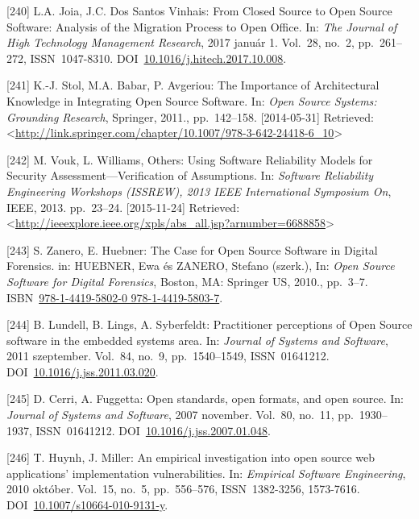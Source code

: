 \documentclass[12pt,magyar,a4paper,oneside]{scrreprt}
\begin{document}
\leavevmode\hypertarget{ref-joia_closed_2017}{}%
{[}240{]} L.A. Joia, J.C. Dos Santos Vinhais: From Closed Source to Open
Source Software: Analysis of the Migration Process to Open Office. In:
\emph{The Journal of High Technology Management Research}, 2017 január
1. Vol.~28, no.~2, pp.~261--272, ISSN~1047-8310.
DOI~\href{https://doi.org/10.1016/j.hitech.2017.10.008}{10.1016/j.hitech.2017.10.008}.

\leavevmode\hypertarget{ref-stol_importance_2011}{}%
{[}241{]} K.-J. Stol, M.A. Babar, P. Avgeriou: The Importance of
Architectural Knowledge in Integrating Open Source Software. In:
\emph{Open Source Systems: Grounding Research}, Springer, 2011.,
pp.~142--158. {[}2014-05-31{]} Retrieved:
\textless{}\url{http://link.springer.com/chapter/10.1007/978-3-642-24418-6_10}\textgreater{}

\leavevmode\hypertarget{ref-vouk_using_2013}{}%
{[}242{]} M. Vouk, L. Williams, Others: Using Software Reliability
Models for Security Assessment---Verification of Assumptions. In:
\emph{Software Reliability Engineering Workshops (ISSREW), 2013 IEEE
International Symposium On}, IEEE, 2013. pp.~23--24. {[}2015-11-24{]}
Retrieved:
\textless{}\url{http://ieeexplore.ieee.org/xpls/abs_all.jsp?arnumber=6688858}\textgreater{}

\leavevmode\hypertarget{ref-huebner_case_2010}{}%
{[}243{]} S. Zanero, E. Huebner: The Case for Open Source Software in
Digital Forensics. in: HUEBNER, Ewa és ZANERO, Stefano (szerk.), In:
\emph{Open Source Software for Digital Forensics}, Boston, MA: Springer
US, 2010., pp.~3--7.
ISBN~\href{https://worldcat.org/isbn/978-1-4419-5802-0\%20978-1-4419-5803-7}{978-1-4419-5802-0 978-1-4419-5803-7}.

\leavevmode\hypertarget{ref-lundell_practitioner_2011}{}%
{[}244{]} B. Lundell, B. Lings, A. Syberfeldt: Practitioner perceptions
of Open Source software in the embedded systems area. In: \emph{Journal
of Systems and Software}, 2011 szeptember. Vol.~84, no.~9,
pp.~1540--1549, ISSN~01641212.
DOI~\href{https://doi.org/10.1016/j.jss.2011.03.020}{10.1016/j.jss.2011.03.020}.

\leavevmode\hypertarget{ref-cerri_open_2007}{}%
{[}245{]} D. Cerri, A. Fuggetta: Open standards, open formats, and open
source. In: \emph{Journal of Systems and Software}, 2007 november.
Vol.~80, no.~11, pp.~1930--1937, ISSN~01641212.
DOI~\href{https://doi.org/10.1016/j.jss.2007.01.048}{10.1016/j.jss.2007.01.048}.

\leavevmode\hypertarget{ref-huynh_empirical_2010}{}%
{[}246{]} T. Huynh, J. Miller: An empirical investigation into open
source web applications' implementation vulnerabilities. In:
\emph{Empirical Software Engineering}, 2010 október. Vol.~15, no.~5,
pp.~556--576, ISSN~1382-3256, 1573-7616.
DOI~\href{https://doi.org/10.1007/s10664-010-9131-y}{10.1007/s10664-010-9131-y}.
\end{document}
